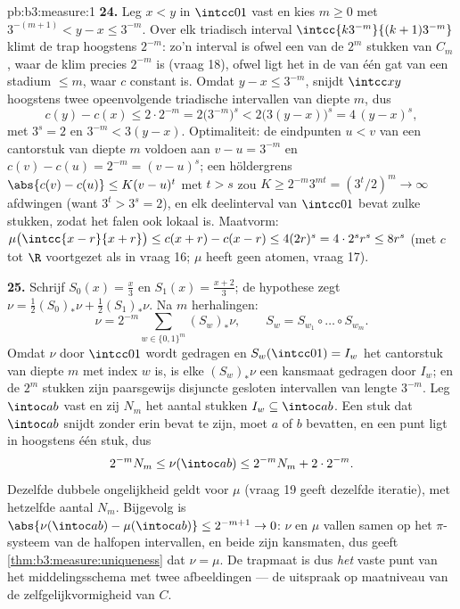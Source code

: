 \begin{solution}{pb:b3:measure:1}
\textbf{24.} Leg $x < y$ in $\intcc01$ vast en kies $m \geq 0$ met
$3^{-(m+1)} < y - x \leq 3^{-m}$. Over elk triadisch interval
$\intcc{k3^{-m}}{(k+1)3^{-m}}$ klimt de trap hoogstens $2^{-m}$:
zo'n interval is ofwel een van de $2^m$ stukken van $C_m$, waar de
klim precies $2^{-m}$ is (vraag 18), ofwel ligt het in de
 van één gat van een stadium $\leq m$, waar $c$ constant
is. Omdat $y - x \leq 3^{-m}$, snijdt $\intcc xy$ hoogstens twee
opeenvolgende triadische intervallen van diepte $m$, dus
\[
c(y) - c(x) \leq 2\cdot2^{-m}
= 2\bigl(3^{-m}\bigr)^{s}
< 2\bigl(3(y - x)\bigr)^{s}
= 4\,(y - x)^{s},
\]
met $3^{s} = 2$ en $3^{-m} < 3(y - x)$. Optimaliteit: de
eindpunten $u < v$ van een cantorstuk van diepte $m$ voldoen aan
$v - u = 3^{-m}$ en $c(v) - c(u) = 2^{-m} = (v - u)^{s}$; een
höldergrens $\abs{c(v) - c(u)} \leq K(v - u)^{t}$ met $t > s$ zou
$K \geq 2^{-m}3^{mt} = (3^{t}/2)^{m} \to \infty$ afdwingen (want
$3^{t} > 3^{s} = 2$), en elk deelinterval van $\intcc01$ bevat
zulke stukken, zodat het falen ook lokaal is. Maatvorm:
$\mu\bigl(\intcc{x-r}{x+r}\bigr) \leq c(x + r) - c(x - r) \leq
4(2r)^{s} = 4\cdot2^{s}r^{s} \leq 8r^{s}$ (met $c$ tot $\R$
voortgezet als in vraag 16; $\mu$ heeft geen atomen, vraag 17).

\textbf{25.} Schrijf $S_0(x) = \frac x3$ en $S_1(x) =
\frac{x+2}3$; de hypothese zegt $\nu = \frac12(S_0)_*\nu +
\frac12(S_1)_*\nu$. Na $m$ herhalingen:
\[
\nu = 2^{-m}\sum_{w \in \{0,1\}^m}(S_w)_*\nu,
\qquad S_w = S_{w_1}\circ\dots\circ S_{w_m}.
\]
Omdat $\nu$ door $\intcc01$ wordt gedragen en $S_w(\intcc01) =
I_w$ het cantorstuk van diepte $m$ met index $w$ is, is elke
$(S_w)_*\nu$ een kansmaat gedragen door $I_w$; en de $2^m$ stukken
zijn paarsgewijs disjuncte gesloten intervallen van lengte
$3^{-m}$. Leg $\intoc ab$ vast en zij $N_m$ het aantal stukken
$I_w \subseteq \intoc ab$. Een stuk dat $\intoc ab$ snijdt zonder
erin bevat te zijn, moet $a$ of $b$ bevatten, en een punt ligt in
hoogstens één stuk, dus
\[
2^{-m}N_m \leq \nu(\intoc ab) \leq 2^{-m}N_m + 2\cdot2^{-m}.
\]
Dezelfde dubbele ongelijkheid geldt voor $\mu$ (vraag 19 geeft
dezelfde iteratie), met hetzelfde aantal $N_m$. Bijgevolg is
$\abs{\nu(\intoc ab) - \mu(\intoc ab)} \leq 2^{-m+1} \to 0$: $\nu$
en $\mu$ vallen samen op het $\pi$-systeem van de halfopen
intervallen, en beide zijn kansmaten, dus geeft
\cref{thm:b3:measure:uniqueness} dat $\nu = \mu$. De trapmaat is
dus \emph{het} vaste punt van het middelingsschema met twee
afbeeldingen --- de uitspraak op maatniveau van de
zelfgelijkvormigheid van $C$.
\end{solution}
